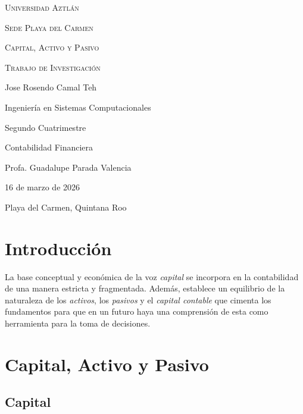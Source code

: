 \documentclass[12pt]{article}
\begin{document}
	

\begin{titlepage}
	\centering
	{\scshape\LARGE Universidad Aztlán \par}
	\vspace{1cm}
	{\scshape\Large Sede Playa del Carmen \par}
	\vspace{3cm}
	{\scshape\Huge Capital, Activo y Pasivo \par}
	\vspace{1cm}
	{\scshape\Large Trabajo de Investigación \par}
	\vspace{3cm}
	{\Large Jose Rosendo Camal Teh \par}
	\vfill
	{\Large Ingeniería en Sistemas Computacionales \par}
	\vspace{0.5cm}
	{\Large Segundo Cuatrimestre \par}
	\vspace{0.5cm}
	{\Large Contabilidad Financiera \par}
	\vfill
	{\Large Profa. Guadalupe Parada Valencia \par}
	\vfill
	{\Large 16 de marzo de 2026 \par}
	\vfill
	{\Large Playa del Carmen, Quintana Roo \par}
\end{titlepage}

\tableofcontents
\newpage

\section{Introducción}

La base conceptual y económica de la voz \emph{capital} se incorpora en la contabilidad de una manera estricta y fragmentada. Además, establece un equilibrio de la naturaleza de los \emph{activos}, los \emph{pasivos} y el \emph{capital contable} que cimenta los fundamentos para que en un futuro haya una comprensión de esta como herramienta para la toma de decisiones.

\section{Capital, Activo y Pasivo}
	
	\subsection{Capital}
	
\end{document}
